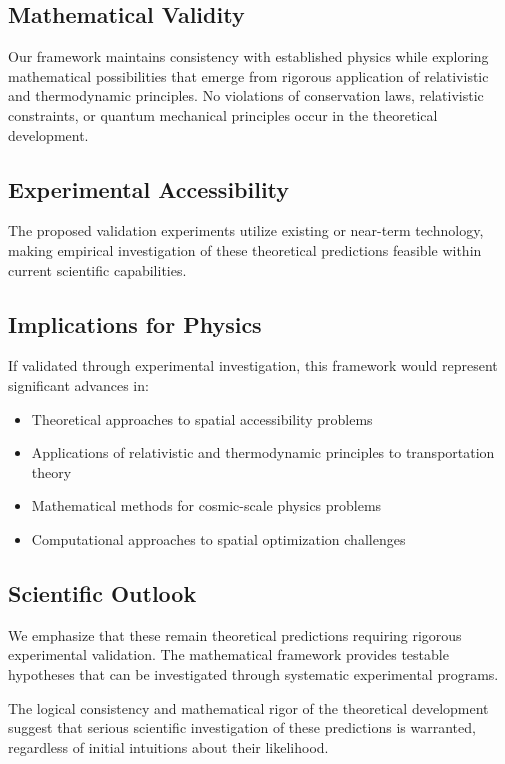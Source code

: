 \documentclass[12pt,a4paper]{article}
\begin{document}
\subsection{Mathematical Validity}

Our framework maintains consistency with established physics while exploring mathematical possibilities that emerge from rigorous application of relativistic and thermodynamic principles. No violations of conservation laws, relativistic constraints, or quantum mechanical principles occur in the theoretical development.

\subsection{Experimental Accessibility}

The proposed validation experiments utilize existing or near-term technology, making empirical investigation of these theoretical predictions feasible within current scientific capabilities.

\subsection{Implications for Physics}

If validated through experimental investigation, this framework would represent significant advances in:

\begin{itemize}
\item Theoretical approaches to spatial accessibility problems
\item Applications of relativistic and thermodynamic principles to transportation theory
\item Mathematical methods for cosmic-scale physics problems
\item Computational approaches to spatial optimization challenges
\end{itemize}

\subsection{Scientific Outlook}

We emphasize that these remain theoretical predictions requiring rigorous experimental validation. The mathematical framework provides testable hypotheses that can be investigated through systematic experimental programs.

The logical consistency and mathematical rigor of the theoretical development suggest that serious scientific investigation of these predictions is warranted, regardless of initial intuitions about their likelihood.
\end{document}
